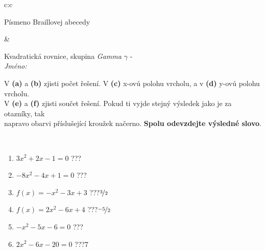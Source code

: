 \documentclass[10pt]{report}
\begin{document}
\begin{tabular}{c:c}
\begin{minipage}[c][104.5mm][t]{0.5\linewidth}
\begin{center}
\begin{minipage}{0.20\linewidth}
\begin{center}
{\small Písmeno Braillovej abecedy}
\end{center}
\end{minipage}
\end{center}
\end{minipage}
&
\begin{minipage}[c][104.5mm][t]{0.5\linewidth}
\begin{center}
\vspace{7mm}
{\huge Kvadratická rovnice, skupina \textit{Gamma $\gamma$} -}\\[5mm]
\textit{Jméno:}\phantom{xxxxxxxxxxxxxxxxxxxxxxxxxxxxxxxxxxxxxxxxxxxxxxxxxxxxxxxxxxxxxxxxx}\\[5mm]
\begin{minipage}{0.95\linewidth}
\begin{center}
V \textbf{(a)} a \textbf{(b)} zjisti počet řešení. V \textbf{(c)} x-ovú polohu vrcholu, a v \textbf{(d)} y-ovú polohu vrcholu.\\V \textbf{(e)} a \textbf{(f)} zjisti součet řešení. Pokud ti vyjde stejný výsledek jako je za otazníky, tak\\napravo obarvi příslušející kroužek načerno. \textbf{Spolu odevzdejte výsledné slovo}.
\end{center}
\end{minipage}
\\[1mm]
\begin{minipage}{0.79\linewidth}
\begin{center}
\begin{varwidth}{\linewidth}
\begin{enumerate}
\Large
\item $3x^2+2x-1=0$\quad \dotfill\; ???\;\dotfill {}
\item $-8x^2-4x+1=0$\quad \dotfill\; ???\;\dotfill {}
\item $f(x)=-x^2-3x+3$\quad \dotfill\; ???\;\dotfill \quad $\nicefrac{3}{2}$
\item $f(x)=2x^2-6x+4$\quad \dotfill\; ???\;\dotfill \quad $\nicefrac{-5}{2}$
\item $-x^2-5x-6=0$\quad \dotfill\; ???\;\dotfill {}
\item $2x^2-6x-20=0$\quad \dotfill\; ???\;\dotfill \quad $7$
\end{enumerate}
\end{varwidth}
\end{center}
\end{minipage}
\begin{minipage}{0.20\linewidth}
\begin{center}

\end{center}
\end{minipage}
\end{center}
\end{minipage}
\end{tabular}
\end{document}
